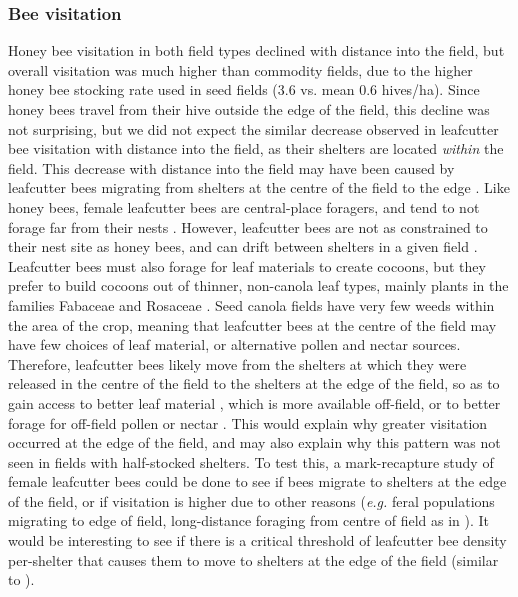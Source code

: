\documentclass[12pt, draft]{article} %
\begin{document}
\subsubsection{Bee visitation} 
Honey bee visitation in both field types declined with distance into the field, but overall visitation was much higher than commodity fields, due to the higher honey bee stocking rate used in seed fields (3.6 vs. mean 0.6 hives/ha).
Since honey bees travel from their hive outside the edge of the field, this decline was not surprising, but we did not expect the similar decrease observed in leafcutter bee visitation with distance into the field, as their shelters are located \textit{within} the field.
This decrease with distance into the field may have been caused by leafcutter bees migrating from shelters at the centre of the field to the edge \citep{goerzen1995}.
Like honey bees, female leafcutter bees are central-place foragers, and tend to not forage far from their nests \citep{peterson2005,pitts2011, brunet2019}.
However, leafcutter bees are not as constrained to their nest site as honey bees, and can drift between shelters in a given field \citep{goerzen1995, pittsSinger2013}.
Leafcutter bees must also forage for leaf materials to create cocoons, but they prefer to build cocoons out of thinner, non-canola leaf types, mainly plants in the families Fabaceae and Rosaceae \citep{sinu2018}.
Seed canola fields have very few weeds within the area of the crop, meaning that leafcutter bees at the centre of the field may have few choices of leaf material, or alternative pollen and nectar sources.
Therefore, leafcutter bees likely move from the shelters at which they were released in the centre of the field to the shelters at the edge of the field, so as to gain access to better leaf material \citep{horne1995}, which is more available off-field, or to better forage for off-field pollen or nectar \citep{horne1995b}.
This would explain why greater visitation occurred at the edge of the field, and may also explain why this pattern was not seen in fields with half-stocked shelters.
To test this, a mark-recapture study of female leafcutter bees could be done to see if bees migrate to shelters at the edge of the field, or if visitation is higher due to other reasons (\textit{e.g.} feral populations migrating to edge of field, long-distance foraging from centre of field as in \citealp{peterson2005}).  %
It would be interesting to see if there is a critical threshold of leafcutter bee density per-shelter that causes them to move to shelters at the edge of the field (similar to \citealp{pittsSinger2013}).
\end{document}
